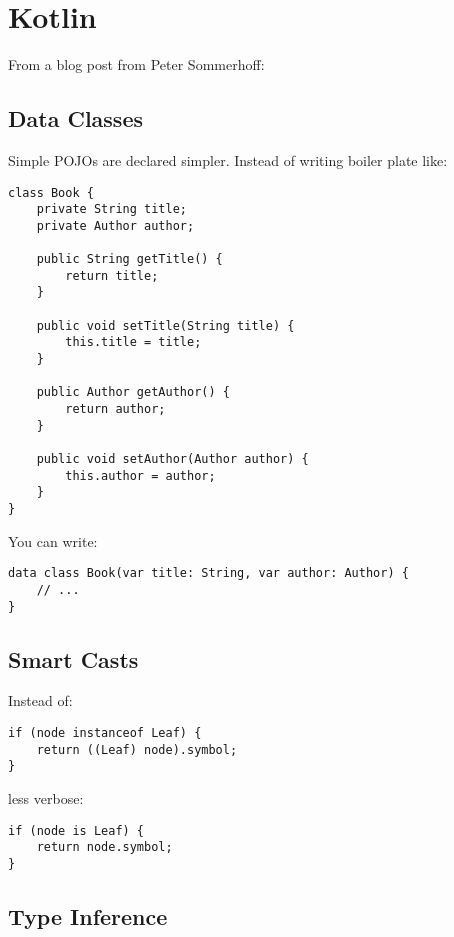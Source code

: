 \documentclass[12pt,a4paper]{report}
\begin{document}
\section{Kotlin}

From a blog post from Peter Sommerhoff\cite{kotlin-sommerhoff}:

\subsection{Data Classes}

Simple POJOs are declared simpler. Instead of writing boiler plate like:

\begin{verbatim}
class Book {
    private String title;
    private Author author;

    public String getTitle() {
        return title;
    }
    
    public void setTitle(String title) {
        this.title = title;
    }

    public Author getAuthor() {
        return author;
    }
    
    public void setAuthor(Author author) {
        this.author = author;
    }
}
\end{verbatim}

You can write:

\begin{verbatim}
data class Book(var title: String, var author: Author) {
    // ...
}	
\end{verbatim}

\subsection{Smart Casts}

Instead of:

\begin{verbatim}
if (node instanceof Leaf) {
    return ((Leaf) node).symbol;
}	
\end{verbatim}

less verbose:

\begin{verbatim}
if (node is Leaf) {
    return node.symbol;
}	
\end{verbatim}

\subsection{Type Inference}
\end{document}
